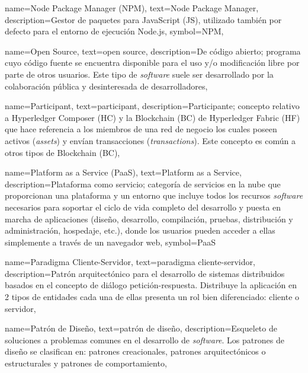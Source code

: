 {
    name={Node Package Manager (NPM)},
    text={Node Package Manager},
    description={Gestor de paquetes para JavaScript (JS), utilizado también por defecto para el entorno de ejecución Node.js},
    symbol={NPM},
}

{
    name={Open Source},
    text={open source},
    description={De código abierto; programa cuyo código fuente se encuentra disponible para el uso y/o modificación libre por parte de otros usuarios. Este tipo de \textit{software} suele ser desarrollado por la colaboración pública y desinteresada de desarrolladores},
}

{
    name={Participant},
    text={participant},
    description={Participante; concepto relativo a Hyperledger Composer (HC) y la Blockchain (BC) de Hyperledger Fabric (HF) que hace referencia a los miembros de una red de negocio los cuales poseen activos (\textit{assets}) y envían transacciones (\textit{transactions}). Este concepto es común a otros tipos de Blockchain (BC)},
}

{
    name={Platform as a Service (PaaS)},
    text={Platform as a Service},
    description={Plataforma como servicio; categoría de servicios en la nube que proporcionan una plataforma y un entorno que incluye todos los recursos \textit{software} necesarios para soportar el ciclo de vida completo del desarrollo y puesta en marcha de aplicaciones (diseño, desarrollo, compilación, pruebas, distribución y administración, hospedaje, etc.), donde los usuarios pueden acceder a ellas simplemente a través de un navegador web},
    symbol={PaaS}
}

{
    name={Paradigma Cliente-Servidor},
    text={paradigma cliente-servidor},
    description={Patrón arquitectónico para el desarrollo de sistemas distribuidos basados en el concepto de diálogo petición-respuesta. Distribuye la aplicación en 2 tipos de entidades cada una de ellas presenta un rol bien diferenciado: cliente o servidor},
}	

{
    name={Patrón de Diseño},
    text={patrón de diseño},
    description={Esqueleto de soluciones a problemas comunes en el desarrollo de \textit{software}. Los patrones de diseño se clasifican en: patrones creacionales, patrones arquitectónicos o estructurales y patrones de comportamiento},
}	
	
